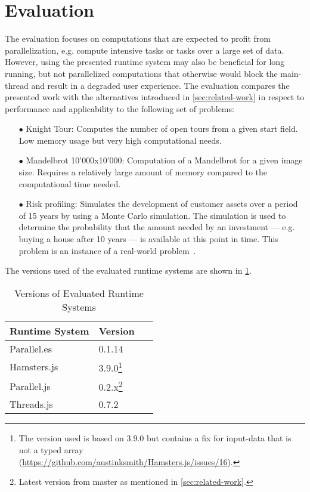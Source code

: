 \section{Evaluation}\label{sec:evaluation}
The evaluation focuses on computations that are expected to profit from parallelization, e.g. compute intensive tasks or tasks over a large set of data. However, using the presented runtime system may also be beneficial for long running, but not parallelized computations that otherwise would block the main-thread and result in a degraded user experience. The evaluation compares the presented work with the alternatives introduced in \cref{sec:related-work} in respect to performance and applicability to the following set of problems:

\begin{itemize}
	\item[$\bullet$] Knight Tour: Computes the number of open tours from a given start field. Low memory usage but very high computational needs.
	\item[$\bullet$] Mandelbrot 10'000x10'000: Computation of a Mandelbrot for a given image size. Requires a relatively large amount of memory compared to the computational time needed.
	\item[$\bullet$] Risk profiling: Simulates the development of customer assets over a period of 15 years by using a Monte Carlo simulation. The simulation is used to determine the probability that the amount needed by an investment --- e.g. buying a house after 10 years --- is available at this point in time. This problem is an instance of a real-world problem~\cite{Kwsoft2016}.
\end{itemize}

The versions used of the evaluated runtime systems are shown in \cref{tab:runtime-system-version}.

\begin{table}
	\centering
	\begin{tabular}{p{0.6\linewidth} l}
		\toprule
		Runtime System & Version \\ \midrule
		Parallel.es & 0.1.14 \\
		Hamsters.js & 3.9.0\footnote{The version used is based on 3.9.0 but contains a fix for input-data that is not a typed array (\url{https://github.com/austinksmith/Hamsters.js/issues/16}).} \\
		Parallel.js & 0.2.x\footnote{Latest version from master as mentioned in \cref{sec:related-work}.} \\
		Threads.js & 0.7.2 \\ \bottomrule
	\end{tabular}
	\caption{Versions of Evaluated Runtime Systems}
	\label{tab:runtime-system-version}
\end{table}



